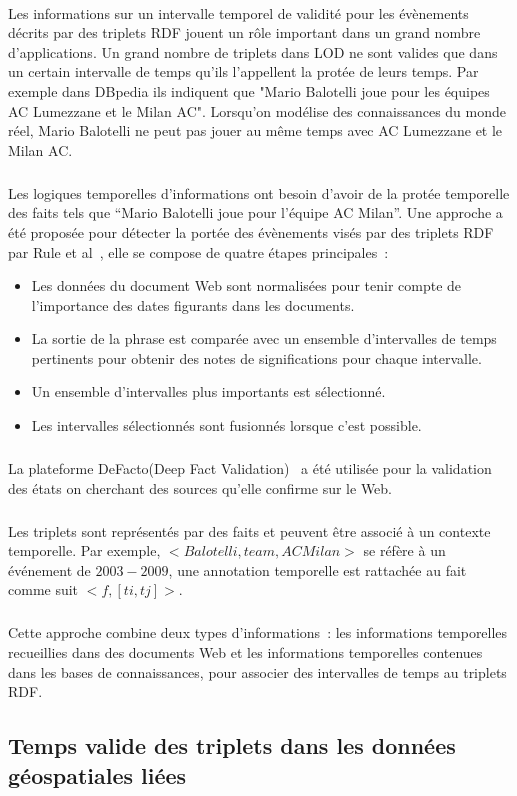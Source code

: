 \documentclass[12pt,a4	]{report}
\begin{document}
\paragraph{}
Les informations sur un intervalle temporel de validité pour les évènements décrits par des triplets RDF jouent un rôle important dans un grand nombre d'applications.
Un grand nombre de triplets dans LOD ne sont valides que dans un certain intervalle de temps qu'ils l'appellent la protée de leurs temps.
Par exemple dans DBpedia ils indiquent que "Mario Balotelli joue pour les équipes AC Lumezzane et le Milan AC". Lorsqu'on modélise des connaissances du monde réel, Mario Balotelli ne peut pas jouer au même temps avec AC Lumezzane et le Milan AC.
\subparagraph{}
Les logiques temporelles d'informations ont besoin d'avoir de la protée temporelle des faits tels que “Mario Balotelli joue pour l'équipe AC Milan”.
Une approche a été proposée pour détecter la portée des évènements visés par des triplets RDF par Rule et al~\cite{rula2013}, elle se compose de quatre étapes principales~:
\begin{itemize}
\item Les données du document Web sont normalisées pour tenir compte de l’importance des dates figurants dans les documents.
\item La sortie de la phrase est comparée avec un ensemble d’intervalles de temps pertinents pour obtenir des notes de significations pour chaque intervalle.
\item Un ensemble d’intervalles plus importants est sélectionné.
\item Les intervalles sélectionnés sont fusionnés lorsque c’est possible.
\end{itemize}
\subparagraph{}
La plateforme DeFacto(Deep Fact Validation)~\cite{lehmann2012} a été utilisée pour la validation des états on cherchant des sources qu'elle confirme sur le Web.
\subparagraph{}
Les triplets sont représentés par des faits et peuvent être associé à un contexte temporelle.
Par exemple, $<Balotelli, team, AC Milan>$ se réfère à un événement de $2003-2009$, une annotation temporelle est rattachée au fait comme suit $<f, [ti,tj]>$.
\subparagraph{}
Cette approche combine deux types d'informations~: les informations temporelles recueillies dans des documents Web et les informations temporelles contenues dans les bases de connaissances, pour associer des intervalles de temps au triplets RDF.
\subsection*{Temps valide des triplets dans les données géospatiales liées}
\end{document}

